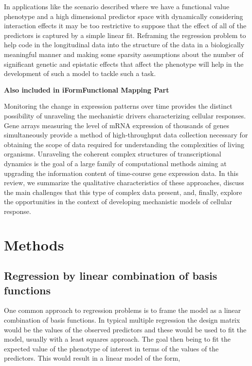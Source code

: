 \documentclass[11pt,]{book}
\theoremstyle{definition}
\theoremstyle{definition}
\theoremstyle{remark}
\begin{document}
In applications like the scenario described where we have a functional
value phenotype and a high dimensional predictor space with dynamically
considering interaction effects it may be too restrictive to suppose
that the effect of all of the predictors is captured by a simple linear
fit. Reframing the regression problem to help code in the longitudinal
data into the structure of the data in a biologically meaningful manner
and making some sparsity assumptions about the number of significant
genetic and epistatic effects that affect the phenotype will help in the
development of such a model to tackle such a task.

\textbf{Also included in iFormFunctional Mapping Part}

Monitoring the change in expression patterns over time provides the
distinct possibility of unraveling the mechanistic drivers
characterizing cellular responses. Gene arrays measuring the level of
mRNA expression of thousands of genes simultaneously provide a method of
high-throughput data collection necessary for obtaining the scope of
data required for understanding the complexities of living organisms.
Unraveling the coherent complex structures of transcriptional dynamics
is the goal of a large family of computational methods aiming at
upgrading the information content of time-course gene expression data.
In this review, we summarize the qualitative characteristics of these
approaches, discuss the main challenges that this type of complex data
present, and, finally, explore the opportunities in the context of
developing mechanistic models of cellular response.
\cite{androulakis2007analysis}

\section{Methods}\label{methods-2}

\subsection{Regression by linear combination of basis
functions}\label{regression-by-linear-combination-of-basis-functions}

One common approach to regression problems is to frame the model as a
linear combination of basis functions. In typical multiple regression
the design matrix would be the values of the observed predictors and
these would be used to fit the model, usually with a least squares
approach. The goal then being to fit the expected value of the phenotype
of interest in terms of the values of the predictors. This would result
in a linear model of the form,
\end{document}
